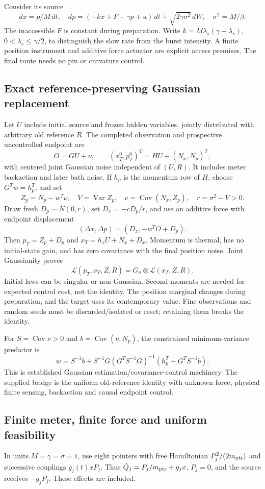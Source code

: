 \documentclass[11pt,a4paper]{article}
\newcommand{\Var}{\operatorname{Var}}\newcommand{\Cov}{\operatorname{Cov}}
\begin{document}
Consider its source
\[
 dx=p/M\,dt,\quad
 dp=(-kx+F-\gamma p+u)\,dt+\sqrt{2\gamma\sigma^2}\,dW,\quad
 \sigma^2=M/\beta.
\]
The inaccessible $F$ is constant during preparation. Write $k=M\lambda_s(\gamma-\lambda_s)$, $0<\lambda_s\le\gamma/2$, to distinguish the slow rate from the burst intensity. A finite position instrument and additive force actuator are explicit access premises. The final route needs no pin or curvature control.

\subsection{Exact reference-preserving Gaussian replacement}
Let $U$ include initial source and frozen hidden variables, jointly distributed with arbitrary old reference $R$. The completed observation and prospective uncontrolled endpoint are
\[
 O=GU+\nu,\qquad (x_T^0,p_T^0)^T=HU+(N_x,N_p)^T,
\]
with centered joint Gaussian noise independent of $(U,R)$. It includes meter backaction and later bath noise. If $h_p$ is the momentum row of $H$, choose $G^Tw=h_p^T$, and set
\[
 Z_p=N_p-w^T\nu,\quad V=\Var Z_p,\quad c=\Cov(N_x,Z_p),
 \quad r=\sigma^2-V>0.
\]
Draw fresh $D_p\sim N(0,r)$, set $D_x=-cD_p/r$, and use an additive force with endpoint displacement
\[
 (\Delta x,\Delta p)=(D_x,-w^TO+D_p).
\]
Then $p_T=Z_p+D_p$ and $x_T=h_xU+N_x+D_x$. Momentum is thermal, has no initial-state gain, and has zero covariance with the final position noise. Joint Gaussianity proves
\[
 \boxed{\mathcal L(p_T,x_T,Z,R)
       =G_\sigma\otimes\mathcal L(x_T,Z,R).}
\]
Initial laws can be singular or non-Gaussian. Second moments are needed for expected control cost, not the identity. The position marginal changes during preparation, and the target uses its contemporary value. Fine observations and random seeds must be discarded/isolated or reset; retaining them breaks the identity.

For $S=\Cov\nu>0$ and $b=\Cov(\nu,N_p)$, the constrained minimum-variance predictor is
\[
 w=S^{-1}b+S^{-1}G(G^TS^{-1}G)^{-1}
       (h_p^T-G^TS^{-1}b).
\]
This is established Gaussian estimation/covariance-control machinery.\cite{chen}
The supplied bridge is the uniform old-reference identity with unknown force, physical finite sensing, backaction and causal endpoint control.

\subsection{Finite meter, finite force and uniform feasibility}
In units $M=\gamma=\sigma=1$, use eight pointers with free Hamiltonian $P_j^2/(2m_{\rm ptr})$ and successive couplings $g_j(t)xP_j$. Thus $\dot Q_j=P_j/m_{\rm ptr}+g_jx$, $\dot P_j=0$, and the source receives $-g_jP_j$. These effects are included.
\end{document}
